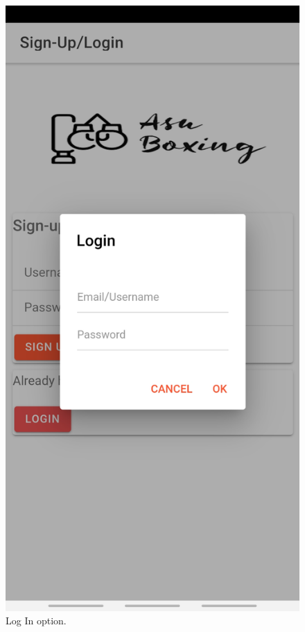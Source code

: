 \documentclass[a4paper,12pt]{report}
\begin{document}
\begin{figure}[ht]
\begin{minipage}[b]{0.5\linewidth}
    \includegraphics[width=.7\linewidth]{images/aplicationImages/logIn.jpeg} 
    \caption{Log In option.} 
    \vspace{4ex}
  \end{minipage} 
  \begin{minipage}[b]{0.5\linewidth}
    \centering

\end{minipage}
\end{figure}
\end{document}
